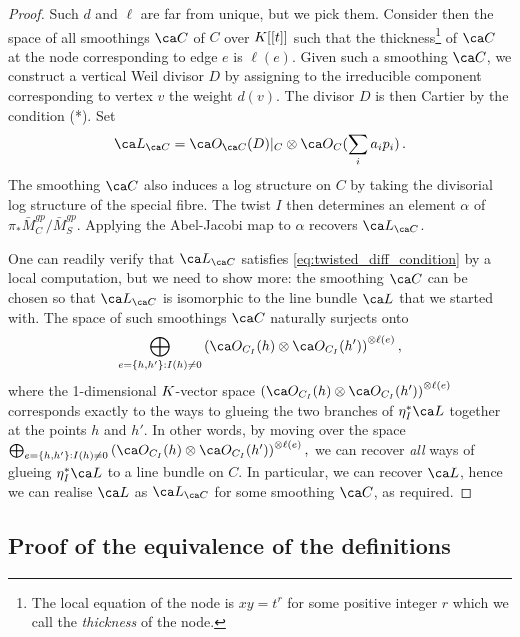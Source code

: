 \begin{proof}
Such $d$ and $\ell$ are far from unique, but we pick them. Consider then the space of all smoothings $\ca C$ of $C$ over ${K}[[t]]$ such that the thickness\footnote{The local equation of the node is $xy = t^r$ for some positive integer $r$ which we call the \emph{thickness} of the node. } of $\ca C$ at the node corresponding to edge $e$ is $\ell(e)$. Given such a smoothing $\ca C$, we construct a vertical Weil divisor $D$ by assigning to the irreducible component corresponding to vertex $v$ the weight $d(v)$. The divisor $D$ is then Cartier by the condition (*). Set $$\ca L_{\ca C} = \ca O_{\ca C}(D)|_{C}\otimes \ca O_C(\sum_i a_i p_i)\, .$$
The smoothing $\ca C$ also induces a log structure on $C$ by  taking the divisorial log structure of the special fibre. The twist $I$ then determines an element $\alpha$ of $\pi_*\bar M_C^{gp}/\bar M_S^{gp}$. Applying the Abel-Jacobi map to $\alpha$ recovers $\ca L_{\ca C}$.

One can readily verify that $\ca L_{\ca C}$ satisfies \eqref{eq:twisted_diff_condition} by a local computation, but we need to show more:  the smoothing $\ca C$ can be chosen so that $\ca L_{\ca C}$ is isomorphic to the line bundle $\ca L$ that we started with. The space of such smoothings $\ca C$ naturally surjects onto
\begin{equation}
\bigoplus_{e = \{ h, h'\} : I(h) \neq 0} \left( \ca O_{C_I}(h) \otimes \ca O_{C_I}(h')\right)^{\otimes \ell(e)},
\end{equation}
where the 1-dimensional $K$-vector space $\left( \ca O_{C_I}(h) \otimes \ca O_{C_I}(h')\right)^{\otimes \ell(e)}$ corresponds exactly to the ways to glueing the two branches of $\eta_I^*\ca L$ together at the points $h$ and $h'$. In other words, by moving over the space $\bigoplus_{e = \{ h, h'\} : I(h) \neq 0} \left( \ca O_{C_I}(h) \otimes \ca O_{C_I}(h')\right)^{\otimes \ell(e)}, $ we can recover \emph{all} ways of glueing $\eta_I^*\ca L$ to a line bundle on $C$. In particular, we can recover $\ca L$, hence we can realise $\ca L$ as $\ca L_{\ca C}$ for some smoothing $\ca C$, as required.
\end{proof}

\subsection{Proof of the equivalence of the definitions}\label{sec:proof_of_equiv_defs}

